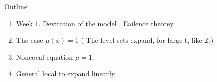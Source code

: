 \documentclass[math]{amznotes}
\begin{document}
Outline 
\begin{enumerate}
    \item Week 1. Deviration of the model , Eailence theorey
    \item The case \(  \mu \left( x \right)= 1   \) ( The level sets expand, for large t, like 2t) 
 \item Noncocal equation  \(  \mu = 1  \). 
 \item General local to expand linearly 
\end{enumerate}
\tableofcontents




\amzindex
\end{document}
